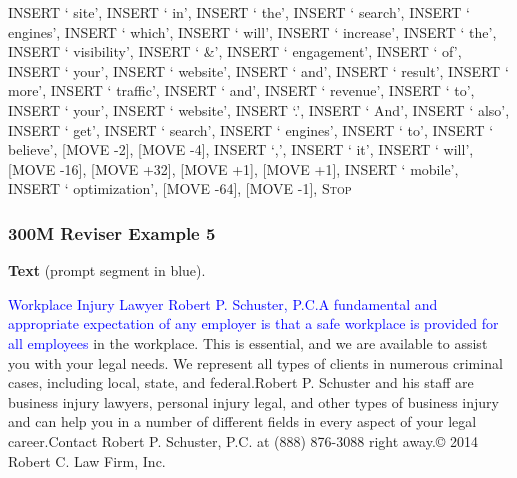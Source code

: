 \documentclass[11pt]{article}
\DeclareRobustCommand{\Stop}{\ifmmode\text{\textsc{Stop}}\else\textsc{Stop}\fi}
\begin{document}
{INSERT ` site', INSERT ` in', INSERT ` the', INSERT ` search', INSERT ` engines', INSERT ` which', INSERT ` will', INSERT ` increase', INSERT ` the', INSERT ` visibility', INSERT ` \&', INSERT ` engagement', INSERT ` of', INSERT ` your', INSERT ` website', INSERT ` and', INSERT ` result', INSERT ` more', INSERT ` traffic', INSERT ` and', INSERT ` revenue', INSERT ` to', INSERT ` your', INSERT ` website', INSERT `.', INSERT ` And', INSERT ` also', INSERT ` get', INSERT ` search', INSERT ` engines', INSERT ` to', INSERT ` believe', [MOVE -2], [MOVE -4], INSERT `,', INSERT ` it', INSERT ` will', [MOVE -16], [MOVE +32], [MOVE +1], [MOVE +1], INSERT ` mobile', INSERT ` optimization', [MOVE -64], [MOVE -1], \Stop\par
}
\vspace{0.8em}
\subsubsection*{300M Reviser Example 5}
\textbf{Text} (prompt segment in blue).\par
\ttfamily\small \textcolor{blue}{Workplace Injury Lawyer \textbar{} Robert P. Schuster, P.C.\newline A fundamental and appropriate expectation of any employer is that a safe workplace is provided for all employees} in the workplace. This is essential, and we are available to assist you with your legal needs. We represent all types of clients in numerous criminal cases, including local, state, and federal.\newline Robert P. Schuster and his staff are business injury lawyers, personal injury legal, and other types of business injury and can help you in a number of different fields in every aspect of your legal career.\newline Contact Robert P. Schuster, P.C. at (888) 876-3088 right away.\newline © 2014 Robert C. Law Firm, Inc.
\end{document}
